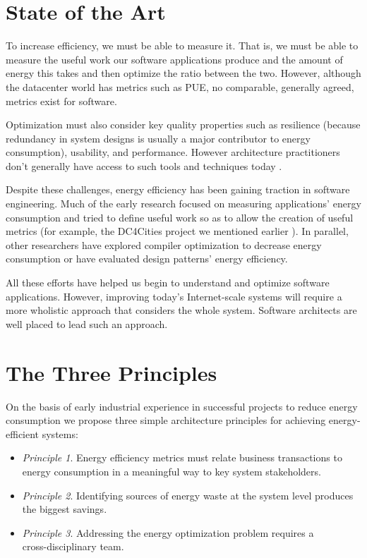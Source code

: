 \section{State of the Art}

To increase efficiency, we must be able to measure it. That is, we must be able to measure the useful work our software applications produce and the amount of energy this takes and then optimize the ratio between the two. However, although the datacenter world has metrics such as PUE, no comparable, generally agreed, metrics exist for software.

Optimization must also consider key quality properties such as resilience (because redundancy in system designs is usually a major contributor to energy consumption), usability, and performance. However architecture practitioners don't generally have access to such tools and techniques today \cite{bashroush2016-datacentreenergy}.

Despite these challenges, energy efficiency has been gaining traction in software engineering. Much of the early research focused on measuring applications' energy consumption \cite{islam2016-energysoftwarefeatures} and tried to define useful work so as to allow the creation of useful metrics (for example, the DC4Cities project we mentioned earlier \cite{dc4cities2014_dcmetrics}). In parallel, other researchers have explored compiler optimization to decrease energy consumption or have evaluated design patterns' energy efficiency.

All these efforts have helped us begin to understand and optimize software applications. However, improving today's Internet-scale systems will require a more wholistic approach that considers the whole system. Software architects are well placed to lead such an approach.

\section{The Three Principles}

On the basis of early industrial experience in successful projects to reduce energy consumption we propose three simple architecture principles for achieving energy-efficient systems:

\begin{itemize}
\item \emph{Principle 1}. Energy efficiency metrics must relate business transactions to energy consumption in a meaningful way to key system stakeholders.
\item \emph{Principle 2}. Identifying sources of energy waste at the system level produces the biggest savings.
\item \emph{Principle 3}. Addressing the energy optimization problem requires a \\ cross-disciplinary team.
\end{itemize}

